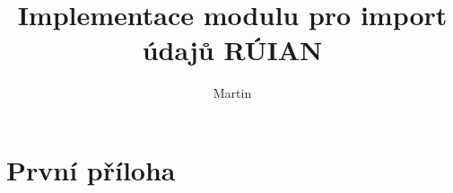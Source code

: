 \documentclass[czech, kiv, ba, he, iso690numb, pdf]{fasthesis}
\title{Implementace modulu pro import údajů RÚIAN}
\author{Martin}{Schön}{}{}
\begin{document}
\frontpages[tm]
\tableofcontents









\appendix
\chapter{První příloha}
\backmatter
\printbibliography
\setbackpageqrcode
\backpage
\end{document}
